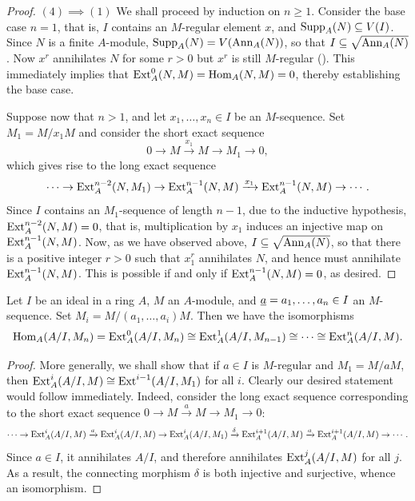 \begin{proof}
    \noindent$(4)\implies(1)$ We shall proceed by induction on $n\ge 1$. Consider the base case $n = 1$, that is, $I$ contains an $M$-regular element $x$, and $\operatorname{Supp}_A(N)\subseteq V(I)$. Since $N$ is a finite $A$-module, $\operatorname{Supp}_A(N) = V(\operatorname{Ann}_A(N))$, so that $I\subseteq\sqrt{\operatorname{Ann}_A(N)}$. Now $x^r$ annihilates $N$ for some $r > 0$ but $x^r$ is still $M$-regular (). This immediately implies that $\operatorname{Ext}^0_A(N, M) = \operatorname{Hom}_A(N, M) = 0$, thereby establishing the base case. 

    Suppose now that $n > 1$, and let $x_1,\dots,x_n\in I$ be an $M$-sequence. Set $M_1 = M/x_1 M$ and consider the short exact sequence 
    \begin{equation*}
        0\to M\xrightarrow{x_1} M\to M_1\to 0,
    \end{equation*}
    which gives rise to the long exact sequence
    \begin{equation*}
        \cdots\to\operatorname{Ext}^{n - 2}_A(N, M_1)\to\operatorname{Ext}^{n - 1}_A(N, M)\xrightarrow{x_1}\operatorname{Ext}^{n - 1}_A(N, M)\to\cdots.
    \end{equation*}
    Since $I$ contains an $M_1$-sequence of length $n - 1$, due to the inductive hypothesis, $\operatorname{Ext}^{n - 2}_A(N, M) = 0$, that is, multiplication by $x_1$ induces an injective map on $\operatorname{Ext}^{n - 1}_A(N, M)$. Now, as we have observed above, $I\subseteq\sqrt{\operatorname{Ann}_A(N)}$, so that there is a positive integer $r > 0$ such that $x_1^r$ annihilates $N$, and hence must annihilate $\operatorname{Ext}^{n - 1}_A(N, M)$. This is possible if and only if $\operatorname{Ext}^{n - 1}_A(N, M) = 0$, as desired.
\end{proof}

\begin{lemma}
    Let $I$ be an ideal in a ring $A$, $M$ an $A$-module, and $\underline{a} = a_1,\dots,a_n\in I$ an $M$-sequence. Set $M_i = M/(a_1,\dots,a_i)M$. Then we have the isomorphisms 
    \begin{equation*}
        \operatorname{Hom}_A(A/I, M_n) = \operatorname{Ext}^0_A(A/I, M_n)\cong\operatorname{Ext}^1_A(A/I, M_{n - 1})\cong\cdots\cong\operatorname{Ext}^n_A(A/I, M).
    \end{equation*}
\end{lemma}
\begin{proof}
    More generally, we shall show that if $a\in I$ is $M$-regular and $M_1 = M/aM$, then $\operatorname{Ext}^i_A(A/I, M)\cong\operatorname{Ext}^{i - 1}(A/I, M_1)$ for all $i$. Clearly our desired statement would follow immediately. Indeed, consider the long exact sequence corresponding to the short exact sequence $0\to M\xrightarrow{a} M\to M_1\to 0$: 
    \begin{equation*}
        \cdots\to\operatorname{Ext}^i_A(A/I, M)\xrightarrow{a}\operatorname{Ext}^i_A(A/I, M)\to\operatorname{Ext}^i_A(A/I, M_1)\xrightarrow{\delta}\operatorname{Ext}^{i + 1}_A(A/I, M)\xrightarrow{a}\operatorname{Ext}^{i + 1}_A(A/I, M)\to\cdots.
    \end{equation*}
    Since $a\in I$, it annihilates $A/I$, and therefore annihilates $\operatorname{Ext}^j_A(A/I, M)$ for all $j$. As a result, the connecting morphism $\delta$ is both injective and surjective, whence an isomorphism. 
\end{proof}

